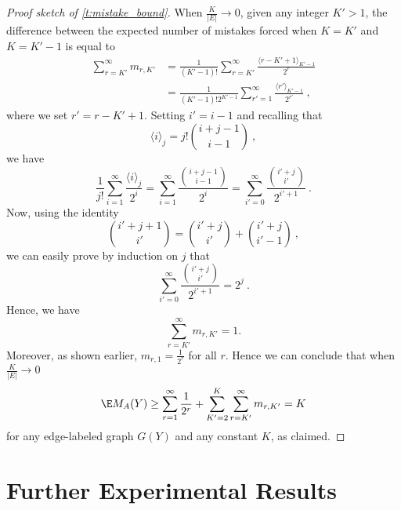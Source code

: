\begin{proof}[Proof sketch of \autoref{t:mistake_bound}]
When $\frac{K}{|E|} \rightarrow 0$, given any integer $K'>1$, the difference between the expected
number of mistakes forced when $K=K'$ and $K=K'-1$ is equal to
%
\begin{align*}
  \sum_{r=K'}^{\infty} m_{r,K'}
  &=
  \frac{1}{(K'-1)!}\sum_{r=K'}^{\infty} \frac{\langle r-K'+1\rangle_{K'-1}}{2^{r}}\\
  &=
  \frac{1}{(K'-1)!2^{K'-1}}\sum_{r'=1}^{\infty} \frac{\langle r'\rangle_{K'-1}}{2^{r'}}~,
\end{align*}
% 
where we set $r'=r-K'+1$.
Setting $i'=i-1$ and recalling that
\[
\langle i\rangle_j=j!{{i+j-1}\choose{i-1}}~,
\]
we have
\[
\frac{1}{j!}\sum_{i=1}^{\infty}\frac{\langle i\rangle_j}{2^i}=
\sum_{i=1}^{\infty}\frac{{{i+j-1}\choose{i-1}}}{2^i}=
\sum_{i'=0}^{\infty}\frac{{{i'+j}\choose{i'}}}{2^{i'+1}}~.
\]
Now, using the identity
\[
{i'+j+1 \choose i'} = {i'+j \choose i'} + {i'+j \choose i'-1}~,
\]
we can easily prove by induction on $j$ that
\[
\sum_{i'=0}^{\infty}\frac{{{i'+j}\choose{i'}}}{2^{i'+1}}=2^j~.
\]
Hence, we have
\[
\sum_{r=K'}^{\infty} m_{r,K'}=1.
\]
Moreover, as shown earlier, $m_{r,1}=\frac{1}{2^{r}}$ for all $r$. Hence we can conclude that when $\frac{K}{|E|} \rightarrow 0$ 
\[
\E M_A(Y) \ge
\sum_{r=1}^{\infty} \frac{1}{2^{r}} +
\sum_{K'=2}^{K} \sum_{r=K'}^{\infty} m_{r,K'}=K
\]
for any edge-labeled graph $G(Y)$ and any constant $K$, as claimed.
\end{proof}


\iffalse %
In the special case when the bias is
\[
    \Psi(Y) = \min\big\{\Psiin(Y),\Psiout(Y)\big\}
\]
where
\[
    \Psiin(Y) = \sum_{j \in V} \min\big\{\din^-(v),\din^+(v)\big\}
\]
and
\[
    \Psiout(Y) = \sum_{i \in V} \min\big\{\dout^-(u),\dout^+(u)\big\}
\]
then using Randomized Weighted Majority on the two experts
\[
    \Yhat^{(1)}_{u,v} = \sgn\left(\frac{1}{2}-\frac{\hdout^-(u)}{\hdout(u)}\right)
\qquad\text{and}\qquad
    \Yhat^{(2)}_{u,v} = \sgn\left(\frac{1}{2}-\frac{\hdin^-(v)}{\hdin(v)}\right)
\]
we get an expected mistake bound of
\[
    2\Psi(Y) + \sqrt{(4\ln 2) \Psi(Y)}~.
\]
\fi %

\section{Further Experimental Results}

